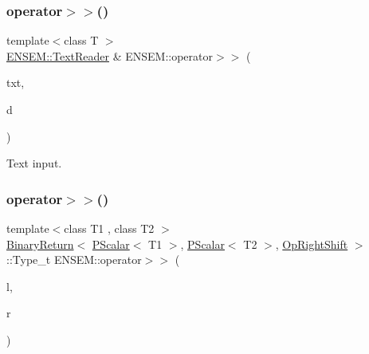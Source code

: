 \mbox{\label{group__primscalar_gae6420bec950e94bc85d5f04a7eee20fe}} 
\subsubsection{\texorpdfstring{operator$>$$>$()}{operator>>()}\hspace{0.1cm}{\footnotesize\ttfamily [2/3]}}
{\footnotesize\ttfamily template$<$class T $>$ \\
\mbox{\hyperlink{classENSEM_1_1TextReader}{E\+N\+S\+E\+M\+::\+Text\+Reader}} \& E\+N\+S\+E\+M\+::operator$>$$>$ (\begin{DoxyParamCaption}\item[{\mbox{\hyperlink{classENSEM_1_1TextReader}{E\+N\+S\+E\+M\+::\+Text\+Reader}} \&}]{txt,  }\item[{\mbox{\hyperlink{classENSEM_1_1PScalar}{P\+Scalar}}$<$ T $>$ \&}]{d }\end{DoxyParamCaption})\hspace{0.3cm}{\ttfamily [inline]}}



Text input. 

\mbox{\label{group__primscalar_ga85954268175e1f847049ff341c964518}} 
\subsubsection{\texorpdfstring{operator$>$$>$()}{operator>>()}\hspace{0.1cm}{\footnotesize\ttfamily [3/3]}}
{\footnotesize\ttfamily template$<$class T1 , class T2 $>$ \\
\mbox{\hyperlink{structENSEM_1_1BinaryReturn}{Binary\+Return}}$<$ \mbox{\hyperlink{classENSEM_1_1PScalar}{P\+Scalar}}$<$ T1 $>$, \mbox{\hyperlink{classENSEM_1_1PScalar}{P\+Scalar}}$<$ T2 $>$, \mbox{\hyperlink{structENSEM_1_1OpRightShift}{Op\+Right\+Shift}} $>$\+::Type\+\_\+t E\+N\+S\+E\+M\+::operator$>$$>$ (\begin{DoxyParamCaption}\item[{const \mbox{\hyperlink{classENSEM_1_1PScalar}{P\+Scalar}}$<$ T1 $>$ \&}]{l,  }\item[{const \mbox{\hyperlink{classENSEM_1_1PScalar}{P\+Scalar}}$<$ T2 $>$ \&}]{r }\end{DoxyParamCaption})\hspace{0.3cm}{\ttfamily [inline]}}

